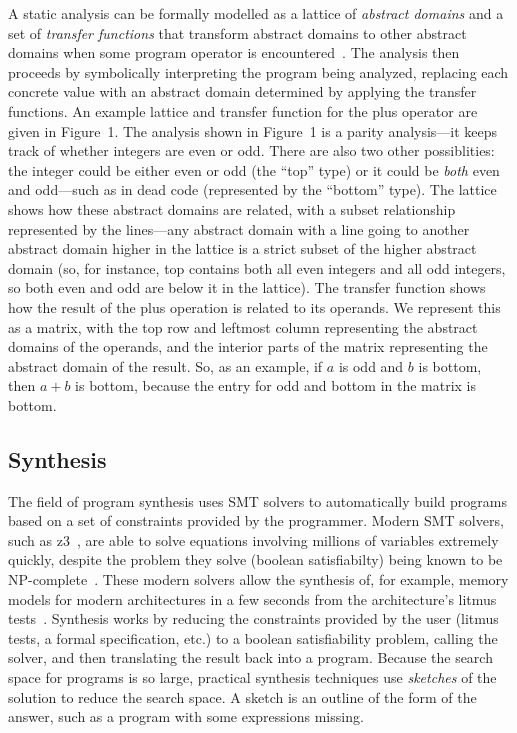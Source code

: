 \documentclass[10pt,conference]{IEEEtran}
\begin{document}
A static analysis can be formally modelled
as a lattice of \textit{abstract domains} and a set of \textit{transfer functions}
that transform abstract domains to other abstract domains when some
program operator is encountered~\cite{cousot77}. The analysis then proceeds by symbolically
interpreting the program being analyzed, replacing each concrete value with
an abstract domain determined by applying the transfer functions. An example
lattice and transfer function for the plus operator are given in Figure~1.
The analysis shown in Figure~1 is a parity analysis---it keeps track of
whether integers are even or odd. There are also two other possiblities:
the integer could be either even or odd (the ``top'' type) or it could
be \textit{both} even and odd---such as in dead code (represented by the
``bottom'' type). The lattice shows how these abstract domains are related,
with a subset relationship represented by the lines---any abstract domain
with a line going to another abstract domain higher in the lattice is a strict
subset of the higher abstract domain (so, for instance, top contains both
all even integers and all odd integers, so both even and odd are below it in the lattice).
The transfer function shows how the result of the plus operation is related
to its operands. We represent this as a matrix, with the top row and leftmost
column representing the abstract domains of the operands, and the interior
parts of the matrix representing the abstract domain of the result. So,
as an example, if $a$ is odd and $b$ is bottom, then $a + b$ is bottom,
because the entry for odd and bottom in the matrix is bottom.

\subsection{Synthesis}
\label{sec-synth}

The field of program synthesis uses SMT solvers to
automatically build programs based on a set of constraints provided
by the programmer. Modern SMT solvers, such as z3~\cite{z3}, are able
to solve equations involving millions of variables extremely quickly, despite 
the problem they solve (boolean satisfiabilty) being known to be NP-complete~\cite{cook71complexity}. 
These modern solvers allow the synthesis of, for example, memory models for modern architectures
in a few seconds from the architecture's litmus tests~\cite{bornholt17}.
Synthesis works by reducing the constraints provided by the user
(litmus tests, a formal specification, etc.) to a boolean satisfiability
problem, calling the solver, and then translating the result back into
a program. Because the search space for programs is so large, practical
synthesis techniques use \textit{sketches} of the solution to reduce
the search space. A sketch is an outline of the form of the answer,
such as a program with some expressions missing.
\end{document}
